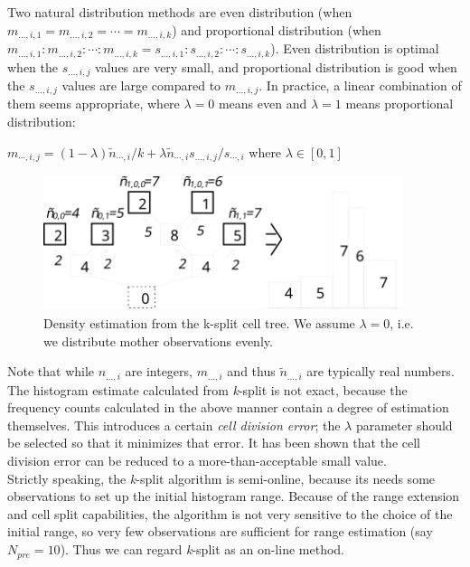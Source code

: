 
Two natural distribution methods are even
distribution (when
$m_{...,i,1} = m_{...,i,2} = \cdots = m_{...,i,k}$) and proportional
distribution (when
$m_{...,i,1} : m_{...,i,2} : \cdots : m_{...,i,k} = s_{...,i,1} : s_{...,i,2} : \cdots : s_{...,i,k}$).
Even distribution is optimal when the
$s_{...,i,j}$ values are very small, and proportional distribution is
good when the $s_{...,i,j}$ values are large compared to
$m_{...,i,j}$. In practice, a linear combination of them seems
appropriate, where $\lambda=0$ means even and $\lambda=1$ means
proportional distribution:


$m_{\cdots,i,j} = (1-\lambda)\tilde{n}_{\cdots,i}/k + \lambda \tilde{n}_{\cdots,i} s_{...,i,j} / s_{\cdots,i}$
where $\lambda\in[0,1]$

\begin{figure}[htbp]
  \begin{center}
    \includegraphics[width=4.147in, height=1.567in]{figures/simlib-ksplit2}
    \caption{Density estimation from the k-split cell tree. We
      assume $\lambda=0$, i.e. we distribute mother observations
      evenly.}
  \end{center}
\end{figure}


Note that while $n_{...,i}$ are integers, $m_{...,i}$ and thus
$\tilde{n}_{...,i}$ are typically real numbers. The histogram estimate
calculated from \textit{k}-split is not exact, because the frequency
counts calculated in the above manner contain a degree of estimation
themselves. This introduces a certain \textit{cell division error};
the $\lambda$ parameter should be selected so that it minimizes that
error. It has been shown that the cell division error can
be reduced to a more-than-acceptable small value.\\
Strictly speaking, the \textit{k}-split algorithm is semi-online,
because its needs some observations to set up the initial histogram
range.  Because of the range extension and cell split
capabilities, the algorithm is not very sensitive to the choice of the
initial range, so very few observations are sufficient for range
estimation (say $N_{pre}=10$). Thus we can regard \textit{k}-split as
an on-line method.


